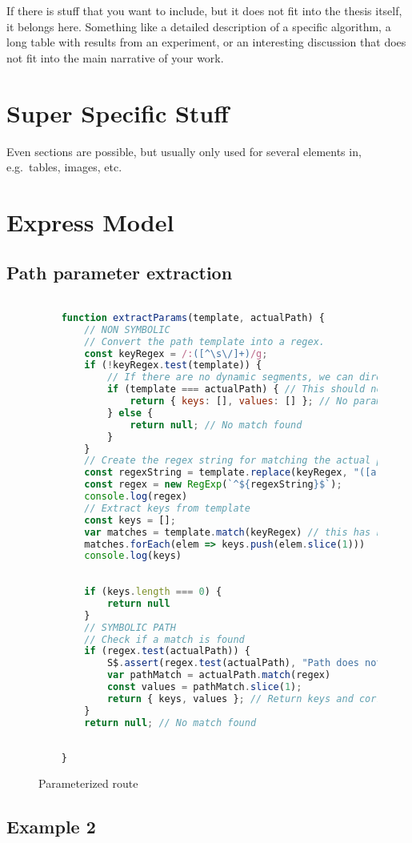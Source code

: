If there is stuff that you want to include, but it does not fit into the thesis itself, it belongs here.
Something like a detailed description of a specific algorithm, a long table with results from an experiment, or an interesting discussion that does not fit into the main narrative of your work.

\section*{Super Specific Stuff}

Even sections are possible, but usually only used for several elements in, e.g.\ tables, images, etc.

\section*{Express Model}
\subsection*{Path parameter extraction}
\begin{figure}[h]
    \begin{lstlisting}[language=JavaScript, gobble=4]

    function extractParams(template, actualPath) {
        // NON SYMBOLIC
        // Convert the path template into a regex. 
        const keyRegex = /:([^\s\/]+)/g;
        if (!keyRegex.test(template)) {
            // If there are no dynamic segments, we can directly compare the paths
            if (template === actualPath) { // This should not be reachable
                return { keys: [], values: [] }; // No parameters, match is found
            } else {
                return null; // No match found
            }
        }
        // Create the regex string for matching the actual path
        const regexString = template.replace(keyRegex, "([a-zA-Z0-9]{1,10})");
        const regex = new RegExp(`^${regexString}$`);
        console.log(regex)
        // Extract keys from template
        const keys = [];
        var matches = template.match(keyRegex) // this has nothing symbolic
        matches.forEach(elem => keys.push(elem.slice(1)))
        console.log(keys)
    
    
        if (keys.length === 0) {
            return null
        }
        // SYMBOLIC PATH
        // Check if a match is found 
        if (regex.test(actualPath)) {
            S$.assert(regex.test(actualPath), "Path does not match")
            var pathMatch = actualPath.match(regex)
            const values = pathMatch.slice(1);
            return { keys, values }; // Return keys and corresponding values}
        }
        return null; // No match found
    
    
    }

    \end{lstlisting}
    \caption{Parameterized route}
    \label{fig:param-route}
\end{figure}


\subsection*{Example 2}
